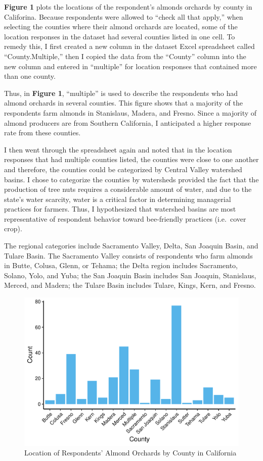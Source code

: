 \documentclass[12pt,]{article}
\begin{document}
\textbf{Figure 1} plots the locations of the respondent's almonds
orchards by county in Califorina. Because respondents were allowed to
``check all that apply,'' when selecting the counties where their almond
orchards are located, some of the location responses in the dataset had
several counties listed in one cell. To remedy this, I first created a
new column in the dataset Excel spreadsheet called ``County.Multiple,''
then I copied the data from the ``County'' column into the new column
and entered in ``multiple'' for location responses that contained more
than one county.

Thus, in \textbf{Figure 1}, ``multiple'' is used to describe the
respondents who had almond orchards in several counties. This figure
shows that a majority of the respondents farm almonds in Stanislaus,
Madera, and Fresno. Since a majority of almond producers are from
Southern California, I anticipated a higher response rate from these
counties.

I then went through the spreadsheet again and noted that in the location
responses that had multiple counties listed, the counties were close to
one another and therefore, the counties could be categorized by Central
Valley watershed basins. I chose to categorize the counties by
watersheds provided the fact that the production of tree nuts requires a
considerable amount of water, and due to the state's water scarcity,
water is a critical factor in determining managerial practices for
farmers. Thus, I hypothesized that watershed basins are most
representative of respondent behavior toward bee-friendly practices
(i.e.~cover crop).

The regional categories include Sacramento Valley, Delta, San Joaquin
Basin, and Tulare Basin. The Sacramento Valley consists of respondents
who farm almonds in Butte, Colusa, Glenn, or Tehama; the Delta region
includes Sacramento, Solano, Yolo, and Yuba; the San Joaquin Basin
includes San Joaquin, Stanislaus, Merced, and Madera; the Tulare Basin
includes Tulare, Kings, Kern, and Fresno.

\begin{figure}
\centering
\includegraphics{Project_Template_files/figure-latex/location plots-1.pdf}
\caption{Location of Respondents' Almond Orchards by County in
California}
\end{figure}
\end{document}
